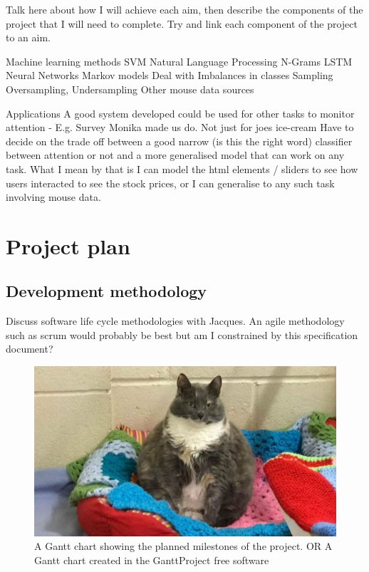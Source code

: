 \documentclass{article}
\begin{document}
Talk here about how I will achieve each aim, then describe the components of the project that I will need to complete.
Try and link each component of the project to an aim.

Machine learning methods
    SVM
    Natural Language Processing
    N-Grams
    LSTM Neural Networks
    Markov models
Deal with Imbalances in classes
    Sampling
    Oversampling, Undersampling
Other mouse data sources

Applications
A good system developed could be used for other tasks to monitor attention - E.g. Survey Monika made us do. Not just for joes ice-cream
Have to decide on the trade off between a good narrow (is this the right word) classifier between attention or not and a more generalised model that can work on any task.
What I mean by that is I can model the html elements / sliders to see how users interacted to see the stock prices, or I can generalise to any such task involving mouse data.

\section{Project plan}

\subsection{Development methodology}
Discuss software life cycle methodologies with Jacques.
An agile methodology such as scrum would probably be best but am I constrained  by this specification document?

\begin{figure}[ht]
    \centering
    \includegraphics[scale=0.35]{Test.JPG}
    \caption{A Gantt chart showing the planned milestones of the project. OR A Gantt chart created in the GanttProject free software}
    \label{fig:Gantt}
\end{figure}
\end{document}
